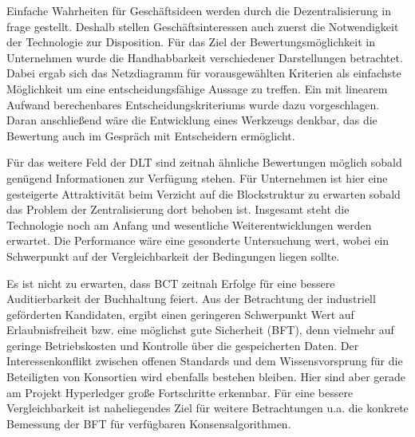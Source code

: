 
Einfache Wahrheiten für Geschäftsideen werden durch die Dezentralisierung in frage gestellt.
Deshalb stellen Geschäftsinteressen auch zuerst die Notwendigkeit der Technologie zur Disposition.
Für das Ziel der Bewertungsmöglichkeit in Unternehmen wurde die Handhabbarkeit verschiedener Darstellungen betrachtet.
Dabei ergab sich das Netzdiagramm für vorausgewählten Kriterien als einfachste Möglichkeit um eine entscheidungsfähige Aussage zu treffen.
Ein mit linearem Aufwand berechenbares Entscheidungskriteriums wurde dazu vorgeschlagen.
Daran anschließend wäre die Entwicklung eines Werkzeugs denkbar, das die Bewertung auch im Gespräch mit Entscheidern ermöglicht.

Für das weitere Feld der \gls{DLT} sind zeitnah ähnliche Bewertungen möglich sobald genügend Informationen zur Verfügung stehen.
Für Unternehmen ist hier eine gesteigerte Attraktivität beim Verzicht auf die Blockstruktur zu erwarten sobald das Problem der Zentralisierung dort behoben ist.
Insgesamt steht die Technologie noch am Anfang und wesentliche Weiterentwicklungen werden erwartet.
Die Performance wäre eine gesonderte Untersuchung wert, wobei ein Schwerpunkt auf der Vergleichbarkeit der Bedingungen liegen sollte.

Es ist nicht zu erwarten, dass \gls{BCT} zeitnah Erfolge für eine bessere Auditierbarkeit der Buchhaltung feiert.
Aus der Betrachtung der industriell geförderten Kandidaten, ergibt einen geringeren Schwerpunkt Wert auf Erlaubnisfreiheit bzw. eine möglichst gute Sicherheit (\gls{BFT}),
denn vielmehr auf geringe Betriebskosten und Kontrolle über die gespeicherten Daten.
Der Interessenkonflikt zwischen offenen Standards und dem Wissensvorsprung für die Beteiligten von Konsortien wird ebenfalls bestehen bleiben.
Hier sind aber gerade am Projekt Hyperledger große Fortschritte erkennbar.
Für eine bessere Vergleichbarkeit ist naheliegendes Ziel für weitere Betrachtungen u.a. die konkrete Bemessung der \gls{BFT} für verfügbaren Konsensalgorithmen.



